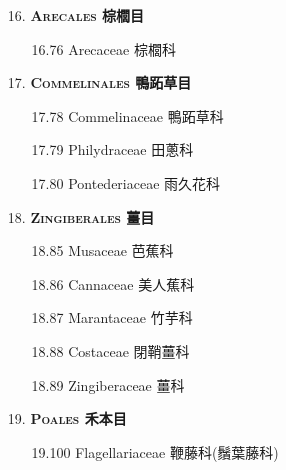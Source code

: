 \begin{enumerate}
  \item[16. ] \textbf{\textsc{Arecales} 棕櫚目}   
    \begin{enumerate}
      \item[16.76] Arecaceae 棕櫚科     
        
    \end{enumerate}
  \item[17. ] \textbf{\textsc{Commelinales} 鴨跖草目}   
    \begin{enumerate}
      \item[17.78] Commelinaceae 鴨跖草科     
        
      \item[17.79] Philydraceae 田蔥科     
        
      \item[17.80] Pontederiaceae 雨久花科     
        
    \end{enumerate}
  \item[18. ] \textbf{\textsc{Zingiberales} 薑目}   
    \begin{enumerate}
      \item[18.85] Musaceae 芭蕉科     
        
      \item[18.86] Cannaceae 美人蕉科     
        
      \item[18.87] Marantaceae 竹芋科     
        
      \item[18.88] Costaceae 閉鞘薑科     
        
      \item[18.89] Zingiberaceae 薑科     
        
    \end{enumerate}
  \item[19. ] \textbf{\textsc{Poales} 禾本目}   
    \begin{enumerate}
      \item[19.100] Flagellariaceae 鞭藤科(鬚葉藤科)     
        

\end{enumerate}
\end{enumerate}
